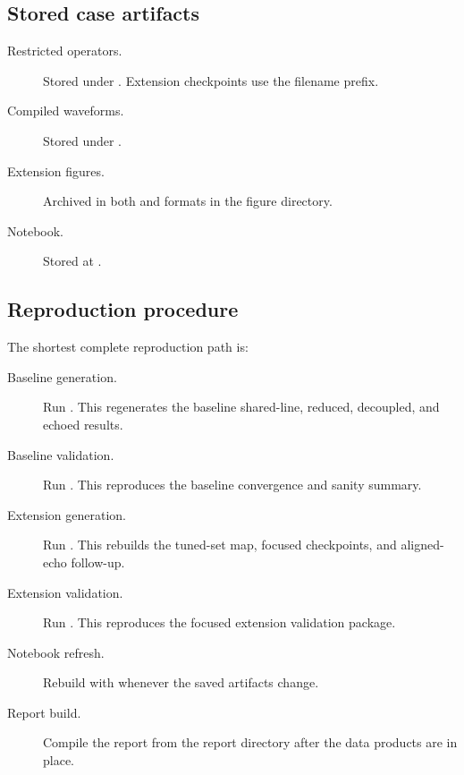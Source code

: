 \documentclass[aps,pra,twocolumn,reprint,floatfix,amsmath,amssymb]{revtex4-2}
\begin{document}
\subsection{Stored case artifacts}

\begin{description}
  \item[Restricted operators.] {\raggedright Stored under . Extension checkpoints use the  filename prefix.\par}
  \item[Compiled waveforms.] {\raggedright Stored under .\par}
  \item[Extension figures.] {\raggedright Archived in both  and  formats in the figure directory.\par}
  \item[Notebook.] {\raggedright Stored at .\par}
\end{description}

\subsection{Reproduction procedure}

The shortest complete reproduction path is:
\begin{description}
  \item[Baseline generation.] {\raggedright Run . This regenerates the baseline shared-line, reduced, decoupled, and echoed results.\par}
  \item[Baseline validation.] {\raggedright Run . This reproduces the baseline convergence and sanity summary.\par}
  \item[Extension generation.] {\raggedright Run . This rebuilds the tuned-set map, focused checkpoints, and aligned-echo follow-up.\par}
  \item[Extension validation.] {\raggedright Run . This reproduces the focused extension validation package.\par}
  \item[Notebook refresh.] {\raggedright Rebuild  with  whenever the saved artifacts change.\par}
  \item[Report build.] {\raggedright Compile the report from the report directory after the data products are in place.\par}
\end{description}

\endgroup



\end{document}
